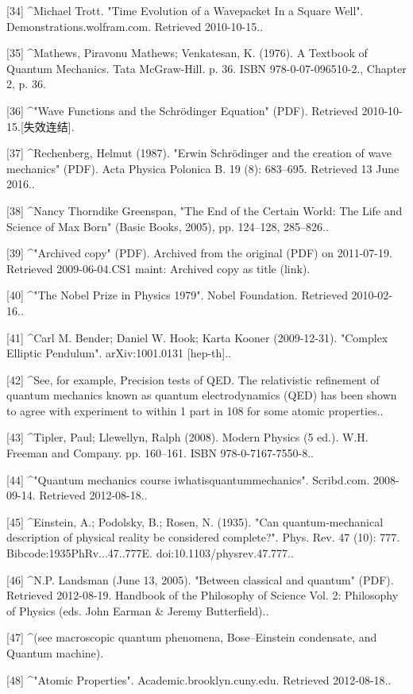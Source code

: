 [34]
^Michael Trott. "Time Evolution of a Wavepacket In a Square Well". Demonstrations.wolfram.com. Retrieved 2010-10-15..

[35]
^Mathews, Piravonu Mathews; Venkatesan, K. (1976). A Textbook of Quantum Mechanics. Tata McGraw-Hill. p. 36. ISBN 978-0-07-096510-2., Chapter 2, p. 36.

[36]
^"Wave Functions and the Schrödinger Equation" (PDF). Retrieved 2010-10-15.[失效连结].

[37]
^Rechenberg, Helmut (1987). "Erwin Schrödinger and the creation of wave mechanics" (PDF). Acta Physica Polonica B. 19 (8): 683–695. Retrieved 13 June 2016..

[38]
^Nancy Thorndike Greenspan, "The End of the Certain World: The Life and Science of Max Born" (Basic Books, 2005), pp. 124–128, 285–826..

[39]
^"Archived copy" (PDF). Archived from the original (PDF) on 2011-07-19. Retrieved 2009-06-04.CS1 maint: Archived copy as title (link).

[40]
^"The Nobel Prize in Physics 1979". Nobel Foundation. Retrieved 2010-02-16..

[41]
^Carl M. Bender; Daniel W. Hook; Karta Kooner (2009-12-31). "Complex Elliptic Pendulum". arXiv:1001.0131 [hep-th]..

[42]
^See, for example, Precision tests of QED. The relativistic refinement of quantum mechanics known as quantum electrodynamics (QED) has been shown to agree with experiment to within 1 part in 108 for some atomic properties..

[43]
^Tipler, Paul; Llewellyn, Ralph (2008). Modern Physics (5 ed.). W.H. Freeman and Company. pp. 160–161. ISBN 978-0-7167-7550-8..

[44]
^"Quantum mechanics course iwhatisquantummechanics". Scribd.com. 2008-09-14. Retrieved 2012-08-18..

[45]
^Einstein, A.; Podolsky, B.; Rosen, N. (1935). "Can quantum-mechanical description of physical reality be considered complete?". Phys. Rev. 47 (10): 777. Bibcode:1935PhRv...47..777E. doi:10.1103/physrev.47.777..

[46]
^N.P. Landsman (June 13, 2005). "Between classical and quantum" (PDF). Retrieved 2012-08-19. Handbook of the Philosophy of Science Vol. 2: Philosophy of Physics (eds. John Earman & Jeremy Butterfield)..

[47]
^(see macroscopic quantum phenomena, Bose–Einstein condensate, and Quantum machine).

[48]
^"Atomic Properties". Academic.brooklyn.cuny.edu. Retrieved 2012-08-18..

